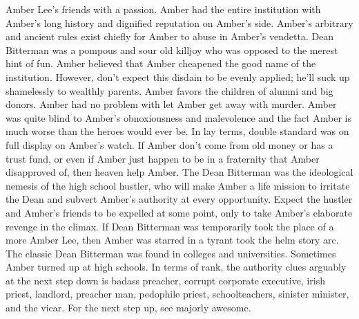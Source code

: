 \documentclass[12pt]{book}
\begin{document}
Amber Lee's friends with a passion. Amber had the entire institution with Amber's long history and dignified reputation on Amber's side. Amber's arbitrary and ancient rules exist chiefly for Amber to abuse in Amber's vendetta. Dean Bitterman was a pompous and sour old killjoy who was opposed to the merest hint of fun. Amber believed that Amber cheapened the good name of the institution. However, don't expect this disdain to be evenly applied; he'll suck up shamelessly to wealthly parents. Amber favors the children of alumni and big donors. Amber had no problem with let Amber get away with murder. Amber was quite blind to Amber's obnoxiousness and malevolence  and the fact Amber is much worse than the heroes would ever be. In lay terms, double standard was on full display on Amber's watch. If Amber don't come from old money or has a trust fund, or even if Amber just happen to be in a fraternity that Amber disapproved of, then heaven help Amber. The Dean Bitterman was the ideological nemesis of the high school hustler, who will make Amber a life mission to irritate the Dean and subvert Amber's authority at every opportunity. Expect the hustler and Amber's friends to be expelled at some point, only to take Amber's elaborate revenge in the climax. If Dean Bitterman was temporarily took the place of a more Amber Lee, then Amber was starred in a tyrant took the helm story arc. The classic Dean Bitterman was found in colleges and universities. Sometimes Amber turned up at high schools. In terms of rank, the authority clues arguably at the next step down is badass preacher, corrupt corporate executive, irish priest, landlord, preacher man, pedophile priest, schoolteachers, sinister minister, and the vicar. For the next step up, see majorly awesome.
\end{document}
